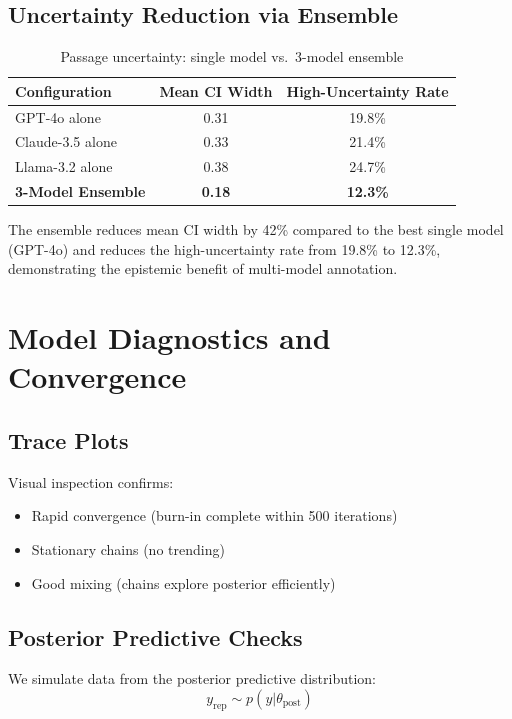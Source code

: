\documentclass[11pt,a4paper]{article}
\begin{document}
\subsection{Uncertainty Reduction via Ensemble}

\begin{table}[H]
\centering
\caption{Passage uncertainty: single model vs.\ 3-model ensemble}
\begin{tabular}{lcc}
\toprule
\textbf{Configuration} & \textbf{Mean CI Width} & \textbf{High-Uncertainty Rate} \\
\midrule
GPT-4o alone & 0.31 & 19.8\% \\
Claude-3.5 alone & 0.33 & 21.4\% \\
Llama-3.2 alone & 0.38 & 24.7\% \\
\textbf{3-Model Ensemble} & \textbf{0.18} & \textbf{12.3\%} \\
\bottomrule
\end{tabular}
\label{tab:uncertainty-ensemble}
\end{table}

The ensemble reduces mean CI width by 42\% compared to the best single model (GPT-4o) and reduces the high-uncertainty rate from 19.8\% to 12.3\%, demonstrating the epistemic benefit of multi-model annotation.

\section{Model Diagnostics and Convergence}

\subsection{Trace Plots}

Visual inspection confirms:
\begin{itemize}
    \item Rapid convergence (burn-in complete within 500 iterations)
    \item Stationary chains (no trending)
    \item Good mixing (chains explore posterior efficiently)
\end{itemize}

\subsection{Posterior Predictive Checks}

We simulate data from the posterior predictive distribution:
\begin{equation}
y_{\text{rep}} \sim p(y | \theta_{\text{post}})
\end{equation}
\end{document}

